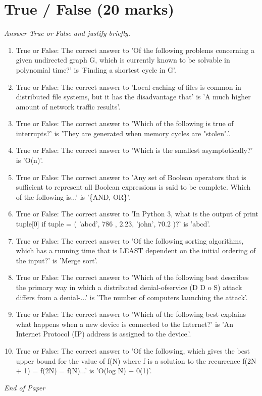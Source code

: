 \documentclass[12pt]{article}
\begin{document}
\section*{True / False (20 marks)}
\textit{Answer True or False and justify briefly.}
\begin{enumerate}[label=\arabic*.]
\item True or False: The correct answer to 'Of the following problems concerning a given undirected graph G, which is currently known to be solvable in polynomial time?' is 'Finding a shortest cycle in G'.
\item True or False: The correct answer to 'Local caching of files is common in distributed file systems, but it has the disadvantage that' is 'A much higher amount of network traffic results'.
\item True or False: The correct answer to 'Which of the following is true of interrupts?' is 'They are generated when memory cycles are "stolen".'.
\item True or False: The correct answer to 'Which is the smallest asymptotically?' is 'O(n)'.
\item True or False: The correct answer to 'Any set of Boolean operators that is sufficient to represent all Boolean expressions is said to be complete. Which of the following is...' is '\{AND, OR\}'.
\item True or False: The correct answer to 'In Python 3, what is the output of print tuple[0] if tuple = ( 'abcd', 786 , 2.23, 'john', 70.2 )?' is 'abcd'.
\item True or False: The correct answer to 'Of the following sorting algorithms, which has a running time that is LEAST dependent on the initial ordering of the input?' is 'Merge sort'.
\item True or False: The correct answer to 'Which of the following best describes the primary way in which a distributed denial-ofservice (D D o S) attack differs from a denial-...' is 'The number of computers launching the attack'.
\item True or False: The correct answer to 'Which of the following best explains what happens when a new device is connected to the Internet?' is 'An Internet Protocol (IP) address is assigned to the device.'.
\item True or False: The correct answer to 'Of the following, which gives the best upper bound for the value of f(N) where f is a solution to the recurrence f(2N + 1) = f(2N) = f(N)...' is 'O(log N) + 0(1)'.
\end{enumerate}

\vfill
\noindent\textit{End of Paper}
\end{document}
